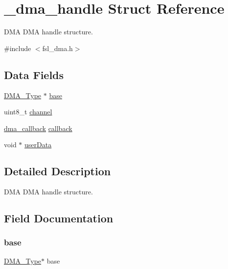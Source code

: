 \hypertarget{struct__dma__handle}{}\section{\+\_\+dma\+\_\+handle Struct Reference}
\label{struct__dma__handle}


D\+MA D\+MA handle structure.  




{\ttfamily \#include $<$fsl\+\_\+dma.\+h$>$}

\subsection*{Data Fields}
\begin{DoxyCompactItemize}
\item 
\mbox{\hyperlink{struct_d_m_a___type}{D\+M\+A\+\_\+\+Type}} $\ast$ \mbox{\hyperlink{struct__dma__handle_ad73048cc14462f3752c981867cfe4a34}{base}}
\item 
uint8\+\_\+t \mbox{\hyperlink{struct__dma__handle_a715f5cb061d11eb75981741eda4dafcd}{channel}}
\item 
\mbox{\hyperlink{group__dma_gab03f33ad69a5875d025f941419247123}{dma\+\_\+callback}} \mbox{\hyperlink{struct__dma__handle_a349f4bafd76816e0efc7bf63284e6efe}{callback}}
\item 
void $\ast$ \mbox{\hyperlink{struct__dma__handle_a2e294dd14122c554baa0665072b4ca7a}{user\+Data}}
\end{DoxyCompactItemize}


\subsection{Detailed Description}
D\+MA D\+MA handle structure. 

\subsection{Field Documentation}
\mbox{\label{struct__dma__handle_ad73048cc14462f3752c981867cfe4a34}} 
\subsubsection{\texorpdfstring{base}{base}}
{\footnotesize\ttfamily \mbox{\hyperlink{struct_d_m_a___type}{D\+M\+A\+\_\+\+Type}}$\ast$ base}

